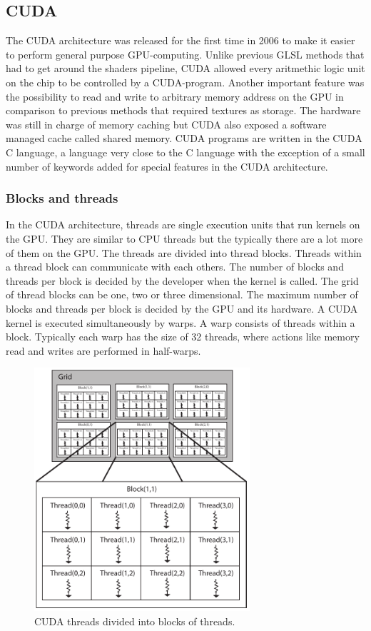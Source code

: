\newpage
\subsection{CUDA}

The CUDA architecture was released for the first time in 2006 to make it easier to perform general purpose GPU-computing\cite{cudapguide}. Unlike previous GLSL methods that had to get around the shaders pipeline, CUDA allowed every aritmethic logic unit on the chip to be controlled by a CUDA-program. Another important feature was the possibility to read and write to arbitrary memory address on the GPU in comparison to previous methods that required textures as storage. The hardware was still in charge of memory caching but CUDA also exposed a software managed cache called shared memory. CUDA programs are written in the CUDA C language, a language very close to the C language with the exception of a small number of keywords added for special features in the CUDA architecture.  
\subsubsection{Blocks and threads}

In the CUDA architecture, threads are single execution units that run kernels on the GPU. They are similar to CPU threads but the typically there are a lot more of them on the GPU. The threads are divided into thread blocks. Threads within a thread block can communicate with each others. The number of blocks and threads per block is decided by the developer when the kernel is called. The grid of thread blocks can be one, two or three dimensional. The maximum number of blocks and threads per block is decided by the GPU and its hardware. A CUDA kernel is executed simultaneously by warps. A warp consists of threads within a block. Typically each warp has the size of 32 threads, where actions like memory read and writes are performed in half-warps. 
\newline

\begin{figure}[ht!]
\centering
\includegraphics[width=80mm]{img/cuda.pdf}
\caption{CUDA threads divided into blocks of threads.}
\label{cudablockthreads}
\end{figure}

